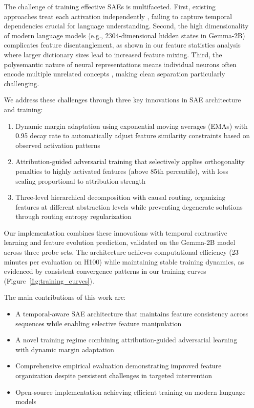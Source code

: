 \documentclass{article} %
\begin{document}
The challenge of training effective SAEs is multifaceted. First, existing approaches treat each activation independently \cite{Makelov2024TowardsPE}, failing to capture temporal dependencies crucial for language understanding. Second, the high dimensionality of modern language models (e.g., 2304-dimensional hidden states in Gemma-2B) complicates feature disentanglement, as shown in our feature statistics analysis where larger dictionary sizes lead to increased feature mixing. Third, the polysemantic nature of neural representations means individual neurons often encode multiple unrelated concepts \cite{Mu2020CompositionalEO}, making clean separation particularly challenging.

We address these challenges through three key innovations in SAE architecture and training:

\begin{enumerate}
    \item Dynamic margin adaptation using exponential moving averages (EMAs) with 0.95 decay rate to automatically adjust feature similarity constraints based on observed activation patterns
    \item Attribution-guided adversarial training that selectively applies orthogonality penalties to highly activated features (above 85th percentile), with loss scaling proportional to attribution strength
    \item Three-level hierarchical decomposition with causal routing, organizing features at different abstraction levels while preventing degenerate solutions through routing entropy regularization
\end{enumerate}

Our implementation combines these innovations with temporal contrastive learning and feature evolution prediction, validated on the Gemma-2B model across three probe sets. The architecture achieves computational efficiency (23 minutes per evaluation on H100) while maintaining stable training dynamics, as evidenced by consistent convergence patterns in our training curves (Figure~\ref{fig:training_curves}).

The main contributions of this work are:
\begin{itemize}
    \item A temporal-aware SAE architecture that maintains feature consistency across sequences while enabling selective feature manipulation
    \item A novel training regime combining attribution-guided adversarial learning with dynamic margin adaptation
    \item Comprehensive empirical evaluation demonstrating improved feature organization despite persistent challenges in targeted intervention
    \item Open-source implementation achieving efficient training on modern language models
\end{itemize}
\end{document}
